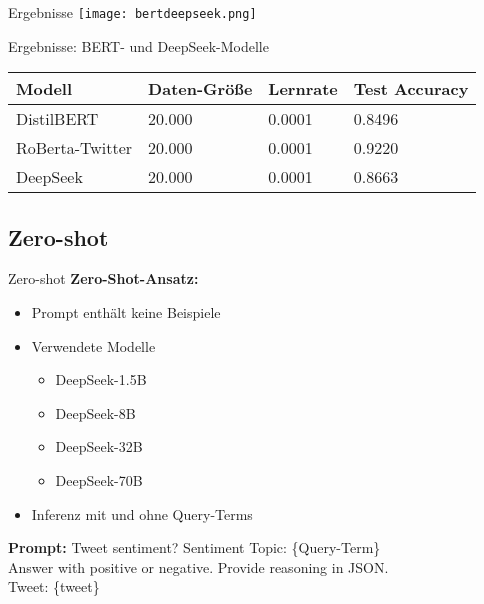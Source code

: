 \documentclass[aspectratio=169]{beamer} %
\begin{document}


\begin{frame}{Ergebnisse}
    \centering
    \texttt{[image: bertdeepseek.png]}
\end{frame}

\begin{frame}{Ergebnisse: BERT- und DeepSeek-Modelle}
    \centering
    \scriptsize
    \begin{tabular}{|l|l|l|l|}
        \hline
        \textbf{Modell} & \textbf{Daten-Größe} & \textbf{Lernrate} & \textbf{Test Accuracy} \\
        \hline
        DistilBERT & 20.000 & 0.0001 & 0.8496 \\
        RoBerta-Twitter & 20.000 & 0.0001 & 0.9220 \\
        DeepSeek & 20.000 & 0.0001 & 0.8663 \\
        \hline
    \end{tabular}
\end{frame}

\subsection{Zero-shot}
\begin{frame}{Zero-shot}
  \textbf{Zero-Shot-Ansatz:}

  \vspace{0.35cm}

  \begin{itemize}
      \item Prompt enthält keine Beispiele
      \item Verwendete Modelle
      \begin{itemize}
          \item DeepSeek-1.5B
          \item DeepSeek-8B
          \item DeepSeek-32B
          \item DeepSeek-70B 
      \end{itemize}
      \item Inferenz mit und ohne Query-Terms
  \end{itemize}
  \vspace{0.2cm}
  \centering
  \textbf{Prompt:} Tweet sentiment? Sentiment Topic: \{Query-Term\} \\ 
  Answer with positive or negative. Provide reasoning in JSON.\\
    Tweet: \glqq\{tweet\}\grqq
\end{frame}
\end{document}

